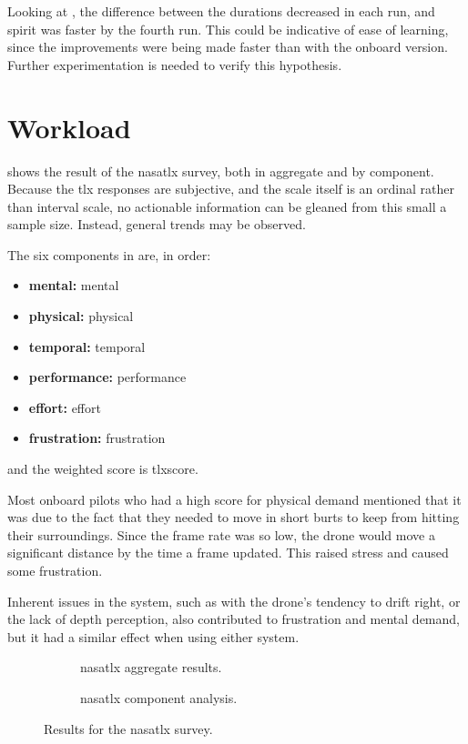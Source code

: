   Looking at , the difference between the durations decreased in each run, and \gls{spirit} was faster by the fourth run.
  This could be indicative of ease of learning, since the improvements were being made faster than with the onboard version.
  Further experimentation is needed to verify this hypothesis.

  \section{Workload}
   shows the result of the \gls{nasatlx} survey, both in aggregate and by component.
  Because the \gls{tlx} responses are subjective, and the scale itself is an ordinal rather than interval scale, no actionable information can be gleaned from this small a sample size.\cite{hart2006}
  Instead, general trends may be observed.

  The six components in  are, in order:

  \begin{itemize}
    \item \textbf{\acrshort{mental}:} \acrlong{mental}
    \item \textbf{\acrshort{physical}:} \acrlong{physical}
    \item \textbf{\acrshort{temporal}:} \acrlong{temporal}
    \item \textbf{\acrshort{performance}:} \acrlong{performance}
    \item \textbf{\acrshort{effort}:} \acrlong{effort}
    \item \textbf{\acrshort{frustration}:} \acrlong{frustration}
  \end{itemize}

  \noindent and the weighted score is \acrshort{tlxscore}.
  
  Most onboard pilots who had a high score for physical demand mentioned that it was due to the fact that they needed to move in short burts to keep from hitting their surroundings.
  Since the frame rate was so low, the drone would move a significant distance by the time a frame updated.
  This raised stress and caused some frustration.

  Inherent issues in the system, such as with the drone's tendency to drift right, or the lack of depth perception, also contributed to frustration and mental demand, but it had a similar effect when using either system.

  \begin{figure}[h]
    \centering
    \begin{subfigure}[b]{0.45\textwidth}
      
      \caption{\gls{nasatlx} aggregate results.}
      \label{fig:results}
    \end{subfigure}
    \hfill
    \begin{subfigure}[b]{0.45\textwidth}
      
      \caption{\gls{nasatlx} component analysis.}
      \label{fig:tlx_components}
    \end{subfigure}
    \caption[NASA-TLX results]{Results for the \gls{nasatlx} survey.}
    \label{fig:tlx}
  \end{figure}

